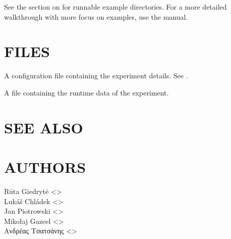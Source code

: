\documentclass[a4paper,english]{article}
\begin{document}
\begin{adjustwidth}{18pt}{0pt}
        See the section on   for runnable example directories.
        For a more detailed walkthrough with more focus on examples, use the  manual.

    \section{FILES}

        \begin{Description}[Files]\setlength{\itemsep}{0cm}
            \item[\File{gourd.toml}] A configuration file containing the experiment details. See .
            \item[\File{<experiment-dir>/<experiment-number>.lock}] A file containing the runtime data of the experiment.
        \end{Description}

    \section{SEE ALSO}



    \section{AUTHORS}
    Rūta Giedrytė <>\\[0.1cm]\MANbr
    Lukáš Chládek <>\\[0.1cm]\MANbr
    Jan Piotrowski <>\\[0.1cm]\MANbr
    Mikołaj Gazeel <>\\[0.1cm]\MANbr
    Ανδρέας Τσατσάνης <>\\[0.1cm]\MANbr

\end{adjustwidth}
\end{document}
